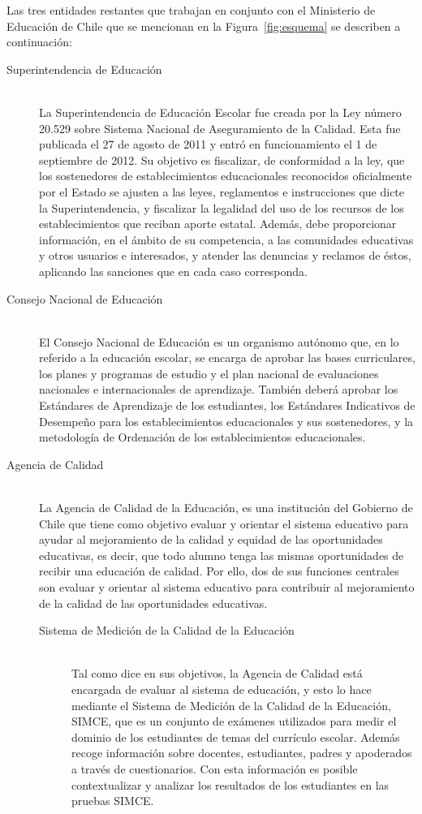 Las tres entidades restantes que trabajan en conjunto con el Ministerio de Educación de Chile que se mencionan en la Figura~\ref{fig:esquema} se describen a continuación: 

\begin{description}
\item[Superintendencia de Educación] \hfill \\
La Superintendencia de Educación Escolar fue creada por la Ley número 20.529 sobre Sistema Nacional de Aseguramiento de la Calidad. Esta fue publicada el 27 de agosto de 2011 y entró en funcionamiento el 1 de septiembre de 2012. 
Su objetivo es fiscalizar, de conformidad a la ley, que los sostenedores de establecimientos educacionales reconocidos oficialmente por el Estado se ajusten a las leyes, reglamentos e instrucciones que dicte la Superintendencia, y fiscalizar la legalidad del uso de los recursos de los establecimientos que reciban aporte estatal. Además, debe proporcionar información, en el ámbito de su competencia, a las comunidades educativas y otros usuarios e interesados, y atender las denuncias y reclamos de éstos, aplicando las sanciones que en cada caso corresponda. \cite{superint}
\item[Consejo Nacional de Educación] \hfill \\
El Consejo Nacional de Educación es un organismo autónomo que, en lo referido a la educación escolar, se encarga de aprobar las bases curriculares, los planes y programas de estudio y el plan nacional de evaluaciones nacionales e internacionales de aprendizaje. También deberá aprobar los Estándares de Aprendizaje de los estudiantes, los Estándares Indicativos de Desempeño para los establecimientos educacionales y sus sostenedores, y la metodología de Ordenación de los establecimientos educacionales.
\item[Agencia de Calidad] \hfill \\
La Agencia de Calidad de la Educación, es una institución del Gobierno de Chile que tiene como objetivo  evaluar y orientar el sistema educativo para ayudar al mejoramiento de la calidad y equidad de las oportunidades educativas, es decir, que todo alumno tenga las mismas oportunidades de recibir una educación de calidad. Por ello, dos de sus funciones centrales son evaluar y orientar al sistema educativo para contribuir al mejoramiento de la calidad de las oportunidades educativas. \cite{agenciacalidad}
    \begin{description}
    \item [Sistema de Medición de la Calidad de la Educación] \hfill \\
    Tal como dice en sus objetivos, la Agencia de Calidad está encargada de evaluar al sistema de educación, y esto lo hace mediante el Sistema de Medición de la Calidad de la Educación, SIMCE, que es un conjunto de exámenes utilizados para medir el dominio de los estudiantes de temas del currículo escolar. Además recoge información sobre docentes, estudiantes, padres y apoderados a través de cuestionarios. Con esta información es posible contextualizar y analizar los resultados de los estudiantes en las pruebas SIMCE. 
    

\end{description}
\end{description}

